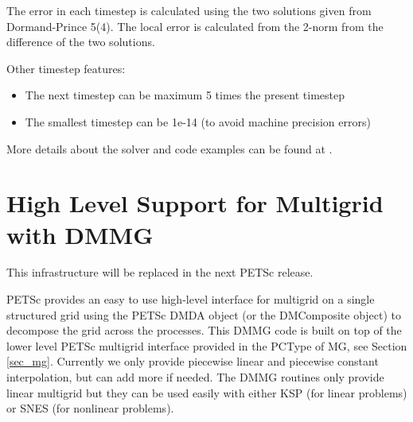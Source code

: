 The error in each timestep is calculated using the two solutions given
from Dormand-Prince 5(4). The local error is calculated from the
2-norm from the difference of the two solutions.

Other timestep features:
\begin{itemize}
  \item The next timestep can be maximum 5 times the present timestep
  \item The smallest timestep can be 1e-14 (to avoid machine precision
  errors)
\end{itemize}

More details about the solver and code examples can be found at
.


\cleardoublepage
\chapter{High Level Support for Multigrid with DMMG}
\label{chapter_dmmg}

This infrastructure will be replaced in the next PETSc release.

PETSc provides an easy to use high-level interface for multigrid on a
single structured grid using the PETSc DMDA object (or the DMComposite
object) to decompose the grid across the processes.  This DMMG code
is built on top of the lower level PETSc multigrid
interface provided in the PCType of MG, see Section
\ref{sec_mg}. Currently we only provide piecewise linear and piecewise
constant interpolation, but can add more if needed. The DMMG routines
only provide linear multigrid but they can be used easily with either
KSP (for linear problems) or SNES (for nonlinear problems).

